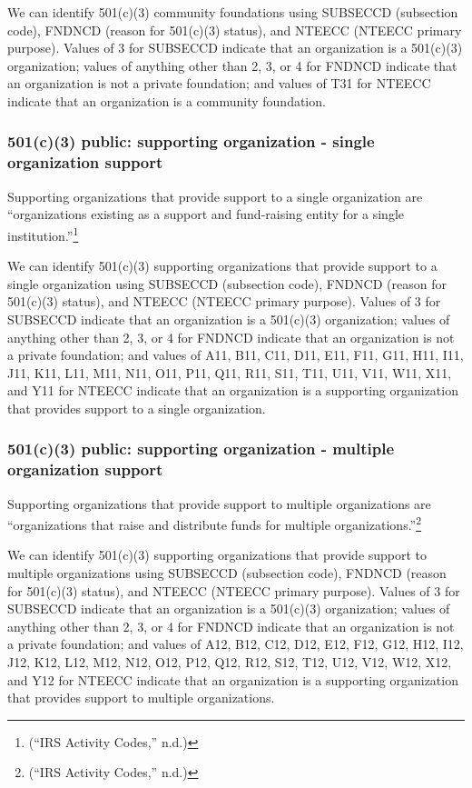 \documentclass[
  letterpaper,
  DIV=11,
  numbers=noendperiod,
  oneside]{scrreprt}
\begin{document}
We can identify 501(c)(3) community foundations using SUBSECCD
(subsection code), FNDNCD (reason for 501(c)(3) status), and NTEECC
(NTEECC primary purpose). Values of 3 for SUBSECCD indicate that an
organization is a 501(c)(3) organization; values of anything other than
2, 3, or 4 for FNDNCD indicate that an organization is not a private
foundation; and values of T31 for NTEECC indicate that an organization
is a community foundation.

\hypertarget{c3-public-supporting-organization---single-organization-support}{%
\subsubsection{501(c)(3) public: supporting organization - single
organization
support}\label{c3-public-supporting-organization---single-organization-support}}

Supporting organizations that provide support to a single organization
are ``organizations existing as a support and fund-raising entity for a
single institution.''\footnote{({``IRS Activity Codes,''} n.d.)}

We can identify 501(c)(3) supporting organizations that provide support
to a single organization using SUBSECCD (subsection code), FNDNCD
(reason for 501(c)(3) status), and NTEECC (NTEECC primary purpose).
Values of 3 for SUBSECCD indicate that an organization is a 501(c)(3)
organization; values of anything other than 2, 3, or 4 for FNDNCD
indicate that an organization is not a private foundation; and values of
A11, B11, C11, D11, E11, F11, G11, H11, I11, J11, K11, L11, M11, N11,
O11, P11, Q11, R11, S11, T11, U11, V11, W11, X11, and Y11 for NTEECC
indicate that an organization is a supporting organization that provides
support to a single organization.

\hypertarget{c3-public-supporting-organization---multiple-organization-support}{%
\subsubsection{501(c)(3) public: supporting organization - multiple
organization
support}\label{c3-public-supporting-organization---multiple-organization-support}}

Supporting organizations that provide support to multiple organizations
are ``organizations that raise and distribute funds for multiple
organizations.''\footnote{({``IRS Activity Codes,''} n.d.)}

We can identify 501(c)(3) supporting organizations that provide support
to multiple organizations using SUBSECCD (subsection code), FNDNCD
(reason for 501(c)(3) status), and NTEECC (NTEECC primary purpose).
Values of 3 for SUBSECCD indicate that an organization is a 501(c)(3)
organization; values of anything other than 2, 3, or 4 for FNDNCD
indicate that an organization is not a private foundation; and values of
A12, B12, C12, D12, E12, F12, G12, H12, I12, J12, K12, L12, M12, N12,
O12, P12, Q12, R12, S12, T12, U12, V12, W12, X12, and Y12 for NTEECC
indicate that an organization is a supporting organization that provides
support to multiple organizations.
\end{document}
